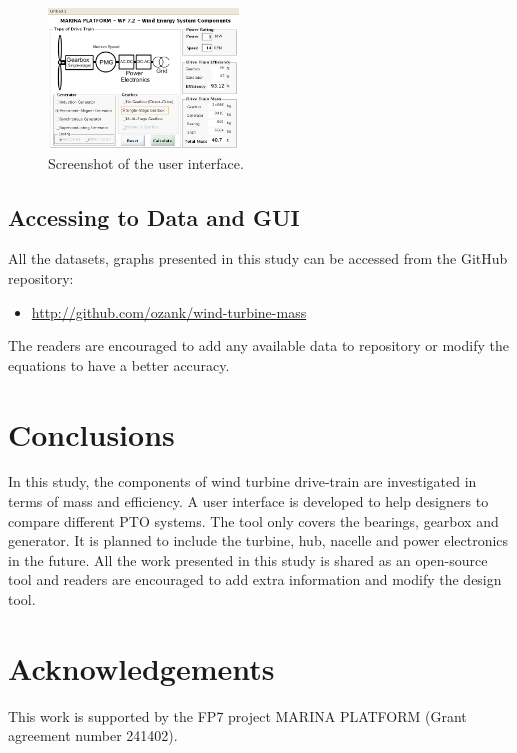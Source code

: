 \documentclass{article}\usepackage{graphicx, color}
\begin{document}
\begin{figure}[t]
  \centering
  \includegraphics[width=0.45\textwidth]{images/marina_gui1}
  \caption{Screenshot of the user interface.} 
  \label{screenshot}
\end{figure}

\subsection{Accessing to Data and GUI}

All the datasets, graphs presented in this study can be accessed from the GitHub repository: 

\begin{itemize}
  \item \url{http://github.com/ozank/wind-turbine-mass}
\end{itemize}

The readers are encouraged to add any available data to repository or modify the equations to have a better accuracy.

\section{Conclusions}

In this study, the components of wind turbine drive-train are investigated in terms of mass and efficiency. A user interface is developed to help designers to compare different PTO systems.  The tool only covers the bearings, gearbox and generator. It is planned to include the turbine, hub, nacelle and power electronics in the future. All the work presented in this study is shared as an open-source tool and readers are encouraged to add extra information and modify the design tool.

\section*{Acknowledgements}
This work is supported by the FP7 project MARINA PLATFORM (Grant
agreement number 241402). 



\noindent
\end{document}
